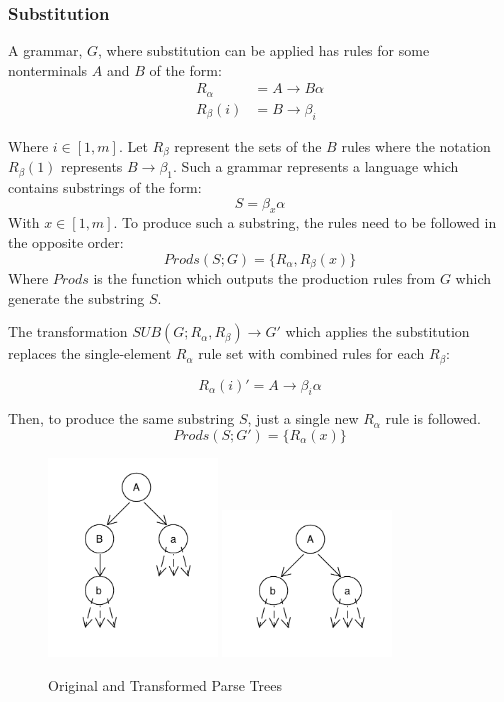 \documentclass[11pt]{article}
\begin{document}
\subsubsection{Substitution}

A grammar, $G$, where substitution can be applied has rules for some nonterminals $A$ and $B$ of the form:
\begin{align*}
R_\alpha &= A \rightarrow B \alpha\\
R_\beta(i) &= B \rightarrow \beta_i
\end{align*}

Where $i \in [1,m]$. Let $R_\beta$ represent the sets of the $B$ rules where the notation
$R_\beta(1)$ represents $B \rightarrow \beta_1$. 
Such a grammar represents a language which contains substrings of the form:
\[ S = \beta_x \alpha\] 
With $x \in [1,m]$.
To produce such a substring, the rules need to be followed in the opposite order:
\[Prods(S;G) = \{R_\alpha, R_\beta(x)\}\]
Where $Prods$ is the function which outputs the production rules from $G$ which generate the substring $S$.

The transformation \cite{aho} $SUB(G; R_\alpha, R_\beta) \rightarrow G'$ which applies the substitution
replaces the single-element $R_\alpha$ rule set with combined rules for each $R_\beta$:

\[ R_\alpha(i)' = A \rightarrow \beta_i \alpha \]

Then, to produce the same substring $S$, just a single new $R_\alpha$ rule is followed. 
\[Prods(S;G') = \{R_\alpha(x)\}\]

\begin{figure}[h!]
    \centering
    \includegraphics[width=0.4\textwidth,natwidth=1,natheight=1]{umlet/sub_orig.pdf}
    \includegraphics[width=0.4\textwidth,natwidth=1,natheight=1]{umlet/sub_comp.pdf}
    \caption{Original and Transformed Parse Trees}
    \label{fig:dlre}
\end{figure}
\end{document}
